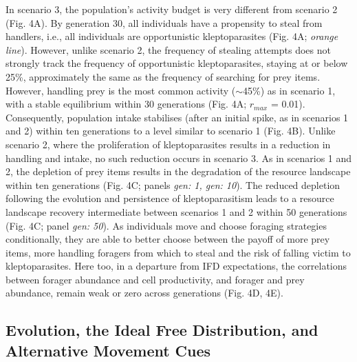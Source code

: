 \documentclass[11pt]{article}
\begin{document}
In scenario 3, the population's activity budget is very different from scenario 2 (Fig. 4A).
By generation 30, all individuals have a propensity to steal from handlers, i.e., all individuals are opportunistic kleptoparasites (Fig. 4A; \textit{orange line}).
However, unlike scenario 2, the frequency of stealing attempts does not strongly track the frequency of opportunistic kleptoparasites, staying at or below 25\%, approximately the same as the frequency of searching for prey items.
However, handling prey is the most common activity ($\sim$45\%) as in scenario 1, with a stable equilibrium within 30 generations (Fig. 4A; $r_{max}$ = 0.01).
Consequently, population intake stabilises (after an initial spike, as in scenarios 1 and 2) within ten generations to a level similar to scenario 1 (Fig. 4B).
Unlike scenario 2, where the proliferation of kleptoparasites results in a reduction in handling and intake, no such reduction occurs in scenario 3.
As in scenarios 1 and 2, the depletion of prey items results in the degradation of the resource landscape within ten generations (Fig. 4C; panels \textit{gen: 1, gen: 10}).
The reduced depletion following the evolution and persistence of kleptoparasitism leads to a resource landscape recovery intermediate between scenarios 1 and 2 within 50 generations (Fig. 4C; panel \textit{gen: 50}).
As individuals move and choose foraging strategies conditionally, they are able to better choose between the payoff of more prey items, more handling foragers from which to steal and the risk of falling victim to kleptoparasites.
Here too, in a departure from IFD expectations, the correlations between forager abundance and cell productivity, and forager and prey abundance, remain weak or zero across generations (Fig. 4D, 4E).

\subsection{Evolution, the Ideal Free Distribution, and Alternative Movement Cues}
\end{document}
